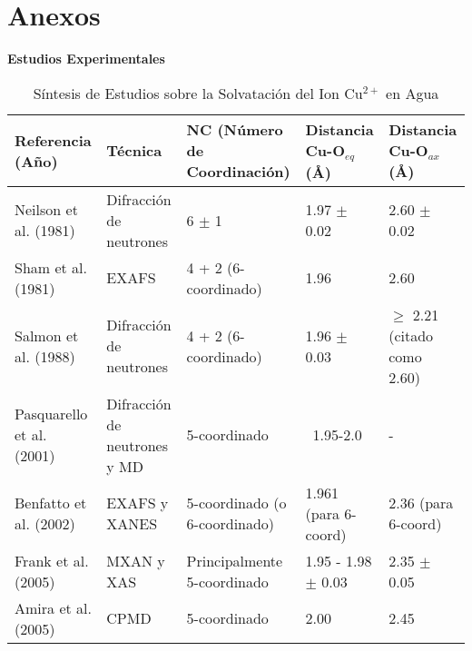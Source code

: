 
\chapter{Anexos}

\begin{sidewaystable}
    \centering
    \caption{Síntesis de Estudios sobre la Solvatación del Ion Cu$^{2+}$ en Agua}
    \label{tab:full}
    {\scriptsize %
    
    \textbf{Estudios Experimentales}
    \vspace{2mm} %
    
    \begin{tabular}{@{}lllll@{}}
    \toprule
    \textbf{Referencia (Año)} & \textbf{Técnica} & \textbf{NC (Número de Coordinación)} & \textbf{Distancia Cu-O$_{eq}$ (\AA)} & \textbf{Distancia Cu-O$_{ax}$ (\AA)} \\
    \midrule
    Neilson et al. (1981)   & Difracción de neutrones & 6 $\pm$ 1                              & 1.97 $\pm$ 0.02                      & 2.60 $\pm$ 0.02                                 \\
    Sham et al. (1981)      & EXAFS                   & 4 + 2 (6-coordinado)                   & 1.96                                 & 2.60                                            \\
    Salmon et al. (1988)    & Difracción de neutrones & 4 + 2 (6-coordinado)                   & 1.96 $\pm$ 0.03                      & $\geq$ 2.21 (citado como 2.60)                  \\
    Pasquarello et al. (2001) & Difracción de neutrones y MD & 5-coordinado                           & ~1.95-2.0                            & -                                               \\
    Benfatto et al. (2002)  & EXAFS y XANES           & 5-coordinado (o 6-coordinado)          & 1.961 (para 6-coord)                 & 2.36 (para 6-coord)                             \\
    Frank et al. (2005)     & MXAN y XAS              & Principalmente 5-coordinado          & 1.95 - 1.98 $\pm$ 0.03               & 2.35 $\pm$ 0.05                                 \\
    Amira et al. (2005)     & CPMD                    & 5-coordinado                           & 2.00                                 & 2.45                                            \\

\end{tabular}}
\end{sidewaystable}

